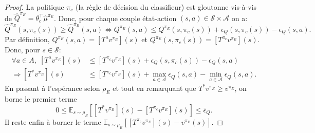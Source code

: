 \documentclass[english,utf8]{./hermes-journal}
\newcommand{\s}{\mathcal{S}}
\newcommand{\A}{\mathcal{A}}
\newcommand{\E}{\mathbb{E}}
\begin{document}
\begin{proof}
  La politique $\pi_c$ (la règle de décision du classifieur) est gloutonne vis-à-vis de 
  $\hat{Q}^{\pi_E}=\theta_c^\top\hat{\mu}^{\pi_E}$. Donc, pour chaque couple état-action
  $(s,a)\in\s\times \A$ on a:
  \begin{equation}
    \hat{Q}^{\pi_E}(s,\pi_c(s))\geq
    \hat{Q}^{\pi_E}(s,a)
    \Leftrightarrow
    Q^{\pi_E}(s,a) \leq Q^{\pi_E}(s,\pi_c(s)) +
    \epsilon_Q(s,\pi_c(s)) - \epsilon_Q(s,a).
  \end{equation}
  Par définition, $Q^{\pi_E}(s,a) = [T^a v^{\pi_E}](s)$ et
  $Q^{\pi_E}(s,\pi_c(s)) = [T^{\pi_c} v^{\pi_E}](s)$. Donc, pour $s\in\s$:
  \begin{align}
    \forall a\in A,\; [T^a v^{\pi_E}](s) &\leq [T^{\pi_c}
    v^{\pi_E}](s) + \epsilon_Q(s,\pi_c(s))-\epsilon_Q(s,a)
    \\
    \Rightarrow [T^* v^{\pi_E}](s) &\leq [T^{\pi_c}
    v^{\pi_E}](s) + \max_{a\in \A}\epsilon_Q(s,a)-\min_{a\in
    \A}\epsilon_Q(s,a).
  \end{align}
  En passant à l'espérance selon $\rho_E$ et tout en remarquant que 
  $T^* v^{\pi_E}\geq v^{\pi_E}$, on borne le premier terme
  \begin{equation}
    0 \leq \E_{s\sim\rho_E}\left[ [T^* v^{\pi_E}](s) - [T^{\pi_c}
    v^{\pi_E}](s)\right] \leq \bar{\epsilon}_Q.
    \label{eq:proof:b1}
  \end{equation}
  Il reste enfin à borner le terme $\E_{s\sim\rho_E}[[T^{\pi_c}v^{\pi_E}](s) -
  v^{\pi_E}(s)]$.


\end{proof}
\end{document}

